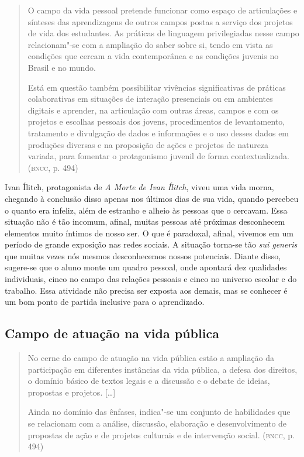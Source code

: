 \documentclass[12pt]{extarticle}
\begin{document}
\begin{quote}
O campo da vida pessoal pretende funcionar como espaço de articulações
e sínteses das aprendizagens de outros campos postas a serviço dos
projetos de vida dos estudantes. As práticas de linguagem privilegiadas
nesse campo relacionam"-se com a ampliação do saber sobre si, tendo em
vista as condições que cercam a vida contemporânea e as condições
juvenis no Brasil e no mundo.

Está em questão também possibilitar vivências significativas de práticas
colaborativas em situações de interação presenciais ou em ambientes
digitais e aprender, na articulação com outras áreas, campos e com os
projetos e escolhas pessoais dos jovens, procedimentos de levantamento,
tratamento e divulgação de dados e informações e o uso desses dados em
produções diversas e na proposição de ações e projetos de natureza
variada, para fomentar o protagonismo juvenil de forma
contextualizada. (\textsc{bncc}, p. 494)
\end{quote}

Ivan Ílitch, protagonista de \emph{A Morte de Ivan Ílitch}, viveu uma
vida morna, chegando à conclusão disso apenas nos últimos dias de sua
vida, quando percebeu o quanto era infeliz, além de estranho e alheio
às pessoas que o cercavam. Essa situação não é tão incomum, afinal,
muitas pessoas até próximas desconhecem elementos muito íntimos de
nosso ser. O que é paradoxal, afinal, vivemos em um período de grande
exposição nas redes sociais. A situação torna-se tão \emph{sui
generis} que muitas vezes nós mesmos desconhecemos nossos potenciais.
Diante disso, sugere-se que o aluno monte um quadro pessoal, onde
apontará dez qualidades individuais, cinco no campo das relações
pessoais e cinco no universo escolar e do trabalho. Essa atividade não
precisa ser exposta aos demais, mas se conhecer é um bom ponto de
partida inclusive para o aprendizado.

\subsection{Campo de atuação na vida pública}

\begin{quote}
No cerne do campo de atuação na vida pública estão a ampliação da
participação em diferentes instâncias da vida pública, a defesa dos
direitos, o domínio básico de textos legais e a discussão e o debate de
ideias, propostas e projetos. {[}\ldots{}{]}

Ainda no domínio das ênfases, indica"-se um conjunto de habilidades que
se relacionam com a análise, discussão, elaboração e desenvolvimento de
propostas de ação e de projetos culturais e de intervenção social.
(\textsc{bncc}, p. 494)
\end{quote}
\end{document}
